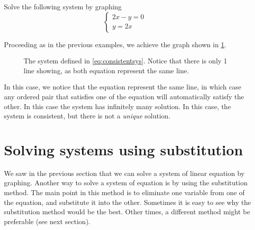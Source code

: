\begin{myexample}
Solve the following system by graphing
\begin{equation}\label{eq:consistentsys}
	\begin{cases}
		2x-y		=	0 &   \\
		y		=	2x   &   
	\end{cases}
\end{equation}
\end{myexample}
\begin{myProof}
	Proceeding as in the previous examples, we achieve the graph shown in \cref{fig:consistentsyst}.
																																									
	\begin{figure}[!h]
		\centering
		\caption{The system defined in \cref{eq:consistentsys}. Notice that there is only 1 line showing,
		as both equation represent the same line.}
		\label{fig:consistentsyst}
	\end{figure}
																																									
	In this case, we notice that the equation represent the same line, in which case
	any ordered pair that satisfies one of the equation will automatically satisfy the other. In
	this case the system has infinitely many solution. In this case, the system is consistent,
	but there is not a {\em unique} solution.
\end{myProof}
																											
\section{Solving systems using substitution}
%
We saw in the previous section that we can solve a system of linear equation by graphing. Another
way to solve a system of equation is by using the substitution method. The main point in this
method is to eliminate one variable from one of the equation, and substitute it into the other.
Sometimes it is easy to see why the substitution method would be the best. Other times, a different
method might be preferable (see next section).
																											
